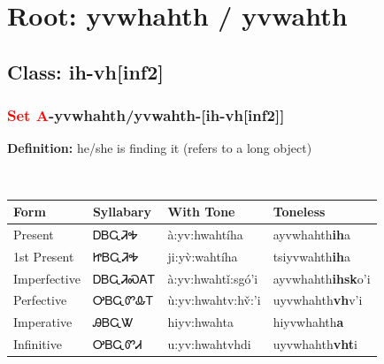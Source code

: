 \needspace{4in}
\section*{Root: yvwhahth / yvwahth}
\nopagebreak
{}
\needspace{3in}
\subsection*{Class: ih-vh[inf2]}
\nopagebreak
\needspace{2in}
\subsubsection*{\textcolor{Red}{Set A}{-}\textbf{yvwhahth/yvwahth}{-}[ih-vh[inf2]]}
\nopagebreak
\textbf{Definition: } he/she is finding it (refers to a long object)
\\[0.5em]
\begin{tabularx}{\textwidth}{l X X X}%
\toprule%
\textbf{Form}&\textbf{Syllabary}&\textbf{With Tone}&\textbf{Toneless}\\%
\midrule%
Present&ᎠᏴᏩᏘᎭ&à:yv:hwahtíha&ayvwhahth\textbf{ih}a\\%
1st Present&ᏥᏴᏩᏘᎭ&ji:yv̀:wahtíha&tsiyvwahth\textbf{ih}a\\%
Imperfective&ᎠᏴᏩᏘᏍᎪᎢ&à:yv:hwahtǐ:sgó’i&ayvwhahth\textbf{ihsk}o'i\\%
Perfective&ᎤᏴᏩᏛᎲᎢ&ù:yv:hwahtv:hv̌:’i&uyvwhahth\textbf{vh}v'i\\%
Imperative&ᎯᏴᏩᏔ&hiyv:hwahta&hiyvwhahth\textbf{a}\\%
Infinitive&ᎤᏴᏩᏛᏗ&u:yv:hwahtvhdi&uyvwhahth\textbf{vht}i\\%
\bottomrule%
\end{tabularx}
\\[1em]